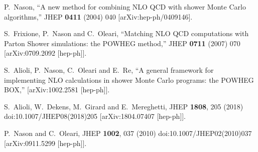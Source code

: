 \documentclass[paper]{JHEP3}
\begin{document}
\begin{thebibliography}{10}

  P.~Nason,
  ``A new method for combining NLO QCD with shower Monte Carlo algorithms,''
  JHEP {\bf 0411} (2004) 040
  [arXiv:hep-ph/0409146].

  S.~Frixione, P.~Nason and C.~Oleari,
``Matching NLO QCD computations with Parton Shower simulations: the POWHEG
method,''
  JHEP {\bf 0711} (2007) 070
  [arXiv:0709.2092 [hep-ph]].

  S.~Alioli, P.~Nason, C.~Oleari and E.~Re,
``A general framework for implementing NLO calculations in shower Monte Carlo
  programs: the POWHEG BOX,''
  [arXiv:1002.2581 [hep-ph]].


  
  S.~Alioli, W.~Dekens, M.~Girard and E.~Mereghetti,
  JHEP {\bf 1808}, 205 (2018)
  doi:10.1007/JHEP08(2018)205
  [arXiv:1804.07407 [hep-ph]].

  P.~Nason and C.~Oleari,
  JHEP {\bf 1002}, 037 (2010)
  doi:10.1007/JHEP02(2010)037
  [arXiv:0911.5299 [hep-ph]].



\end{thebibliography}
\end{document}
